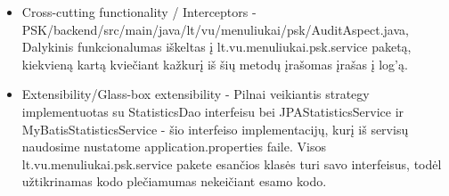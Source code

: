 \documentclass{VUMIFInfKursinis}
\begin{document}
\begin{flushleft}
\begin{itemize}
	\item{Cross-cutting functionality / Interceptors -
	 \linebreak PSK/backend/src/main/java/lt/vu/menuliukai/psk/AuditAspect.java, Dalykinis funkcionalumas iškeltas į lt.vu.menuliukai.psk.service paketą, kiekvieną kartą kviečiant kažkurį iš šių metodų įrašomas įrašas į log'ą.}
	\item{Extensibility/Glass-box extensibility - Pilnai veikiantis strategy implementuotas su StatisticsDao interfeisu bei JPAStatisticsService ir MyBatisStatisticsService - šio interfeiso implementacijų, kurį iš  servisų naudosime nustatome application.properties faile. Visos lt.vu.menuliukai.psk.service pakete esančios klasės turi savo interfeisus, todėl užtikrinamas kodo plečiamumas nekeičiant esamo kodo.}
\end{itemize}
\end{flushleft}
\end{document}
